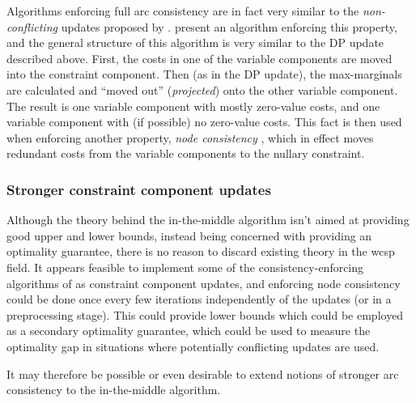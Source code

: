 Algorithms enforcing full arc consistency are in fact very similar to the \emph{non-conflicting} updates proposed by \textcite{Wedelin08}.
\Textcite[\pno~85\psq]{deGivry05} present an algorithm enforcing this property, and the general structure of this algorithm is very similar to the DP update described above.
First, the costs in one of the variable components are moved into the constraint component.
Then (as in the DP update), the max-marginals are calculated and \enquote{moved out} (\emph{projected}) onto the other variable component.
The result is one variable component with mostly zero-value costs, and one variable component with (if possible) no zero-value costs.
This fact is then used when enforcing another property, \emph{node consistency} \parencite[\pno~7]{Cooper10}, which in effect moves redundant costs from the variable components to the nullary constraint.

\subsubsection{Stronger constraint component updates}
Although the theory behind the in-the-middle algorithm isn't aimed at providing good upper and lower bounds, instead being concerned with providing an optimality guarantee, there is no reason to discard existing theory in the \gls{wcsp} field.
It appears feasible to implement some of the consistency-enforcing algorithms of \textcite{deGivry05} as constraint component updates, and enforcing node consistency could be done once every few iterations independently of the updates (or in a preprocessing stage).
This could provide lower bounds which could be employed as a secondary optimality guarantee, which could be used to measure the optimality gap in situations where potentially conflicting updates are used.

It may therefore be possible or even desirable to extend notions of stronger arc consistency to the in-the-middle algorithm.
